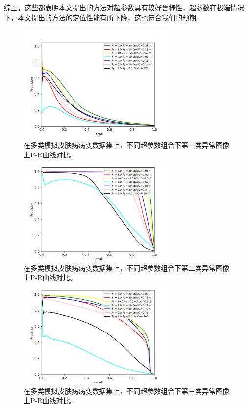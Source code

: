 综上，这些都表明本文提出的方法对超参数具有较好鲁棒性，超参数在极端情况下，本文提出的方法的定位性能有所下降，这也符合我们的预期。
\begin{figure}[H]
	\centering
	\includegraphics[width=0.7\textwidth]{figure/pr_curve_multi_skin_hyper_paras/IMAGE_NET_pr_curve.png}
	\caption[不同超参数组合下第一类异常图像上P-R曲线对比]{在多类模拟皮肤病病变数据集上，不同超参数组合下第一类异常图像上P-R曲线对比。} 
	\label{fig:multi_simulate_pr_curve_image_net_hyper_paras}
\end{figure}
\vspace{-0.3cm}
\begin{figure}[H]
	\centering
	\includegraphics[width=0.7\textwidth]{figure/pr_curve_multi_skin_hyper_paras/SKIN_pr_curve.png}
	\caption[不同超参数组合下第二类异常图像上P-R曲线对比]{在多类模拟皮肤病病变数据集上，不同超参数组合下第二类异常图像上P-R曲线对比。}
	\label{fig:multi_simulate_pr_curve_skin_hyper_paras}
\end{figure}
\begin{figure}[H]
	\centering
	\includegraphics[width=0.7\textwidth]{figure/pr_curve_multi_skin_hyper_paras/CIRCLE_pr_curve.png}
	\caption[不同超参数组合下第三类异常图像上P-R曲线对比]{在多类模拟皮肤病病变数据集上，不同超参数组合下第三类异常图像上P-R曲线对比。} 
	\label{fig:multi_simulate_pr_curve_circle_hyper_paras}
\end{figure}

